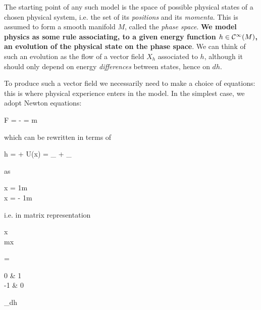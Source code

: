 \documentclass[main.tex]{subfiles}
\begin{document}
\begin{construction}
\label{const:symp_struct_for_ham_mechanics}
	The starting point of any such model is the space of possible physical states of a chosen physical system, i.e. the set of its \emph{positions} and its \emph{momenta}. This is assumed to form a smooth manifold $M$, called the \emph{phase space}. \textbf{We model physics as some rule associating, to a given energy function $h \in \mathcal{C}^\infty(M)$, an evolution of the physical state on the phase space}. We can think of such an evolution as the flow of a vector field $X_h$ associated to $h$, although it should only depend on energy \emph{differences} between states, hence on $dh$.

	To produce such a vector field we necessarily need to make a choice of equations: this is where physical experience enters in the model. In the simplest case, we adopt Newton equations:
	\begin{eqalign}
		F = -  = m 
	\end{eqalign}
	which can be rewritten in terms of
	\begin{eqalign}
		h =  + U(x) = _{} + _{\text{potential energy}}
	\end{eqalign}
	as
	\begin{eqalign}
		\begin{dcases}
			\dot x = \frac1m \bigpder{h}{\dot x}\\
			\ddot x = - \frac1m \bigpder{h}{x}
		\end{dcases}
	\end{eqalign}
	i.e. in matrix representation
	\begin{eqalign}
		 \begin{pmatrix} x \\ m\dot x \end{pmatrix} = \begin{pmatrix} 0 & 1\\-1 & 0\end{pmatrix}_{dh}
	\end{eqalign}

\end{construction}
\end{document}
